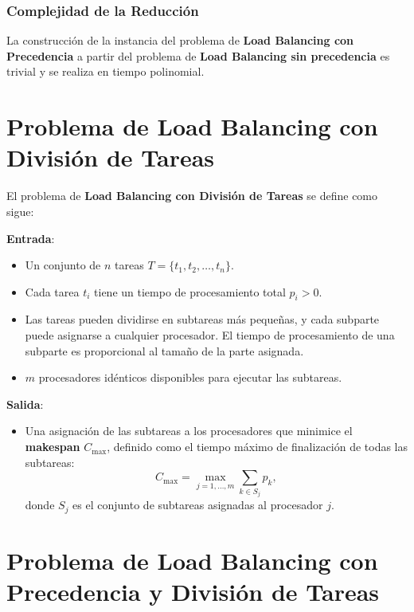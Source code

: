 \documentclass{report}
\begin{document}
	\subsubsection*{Complejidad de la Reducción}
	
	La construcción de la instancia del problema de \textbf{Load Balancing con Precedencia} a partir del problema de \textbf{Load Balancing sin precedencia} es trivial y se realiza en tiempo polinomial.
	
	
	
	
	
	\section{Problema de Load Balancing con División de Tareas}
	
	El problema de \textbf{Load Balancing con División de Tareas} se define como sigue:
	
	\textbf{Entrada}:
	\begin{itemize}
		\item Un conjunto de $ n $ tareas $ T = \{t_1, t_2, \dots, t_n\} $.
		\item Cada tarea $ t_i $ tiene un tiempo de procesamiento total $ p_i > 0 $.
		\item Las tareas pueden dividirse en subtareas más pequeñas, y cada subparte puede asignarse a cualquier procesador. El tiempo de procesamiento de una subparte es proporcional al tamaño de la parte asignada.
		\item $ m $ procesadores idénticos disponibles para ejecutar las subtareas.
	\end{itemize}
	
	\textbf{Salida}:
	\begin{itemize}
		\item Una asignación de las subtareas a los procesadores que minimice el \textbf{makespan} $ C_{\text{max}} $, definido como el tiempo máximo de finalización de todas las subtareas:
		\[
		C_{\text{max}} = \max_{j=1, \dots, m} \sum_{k \in S_j} p_k,
		\]
		donde $ S_j $ es el conjunto de subtareas asignadas al procesador $ j $.
	\end{itemize}
	
	
	
	
	\section{Problema de Load Balancing con Precedencia y División de Tareas}
	
\end{document}
